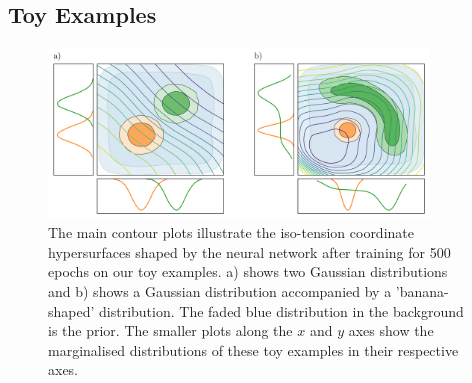 \documentclass[%
 reprint,
 amsmath,amssymb,
 aps,
]{revtex4-2}
\begin{document}






\subsection{Toy Examples}

\begin{figure}
    \includegraphics[width=0.9\textwidth]{../plots/toy_wide.png}
    \centering
    \caption{The main contour plots illustrate the iso-tension coordinate hypersurfaces shaped by the neural network after training for 500 epochs on our toy examples. a) shows two Gaussian distributions and b) shows a Gaussian distribution accompanied by a 'banana-shaped' distribution. The faded blue distribution in the background is the prior. The smaller plots along the $x$ and $y$ axes show the marginalised distributions of these toy examples in their respective axes.}
    \label{fig:toy}
\end{figure}
\end{document}
